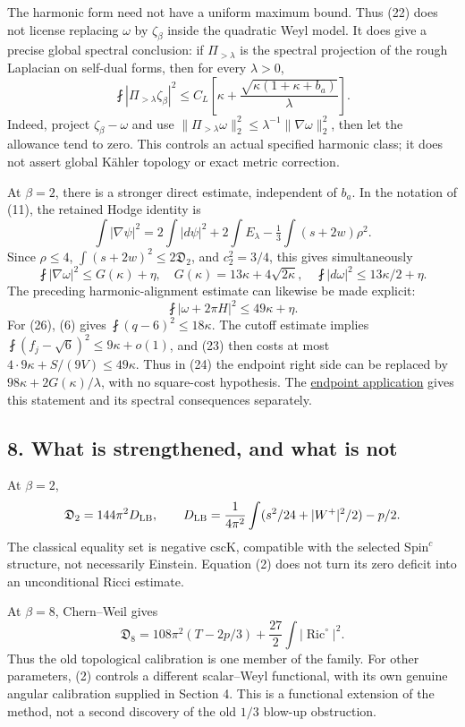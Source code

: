 \documentclass[
  10pt,
]{article}
\begin{document}
The harmonic form need not have a uniform maximum bound. Thus (22) does
not license replacing \(\omega\) by \(\zeta_\beta\) inside the quadratic
Weyl model. It does give a precise global spectral conclusion: if
\(\Pi_{>\lambda}\) is the spectral projection of the rough Laplacian on
self-dual forms, then for every \(\lambda>0\), \[
\fint|\Pi_{>\lambda}\zeta_\beta|^2
\le C_L\left[\kappa+
\frac{\sqrt{\kappa(1+\kappa+b_a)}}{\lambda}\right].
\tag{24}
\] Indeed, project \(\zeta_\beta-\omega\) and use
\(\|\Pi_{>\lambda}\omega\|_2^2 \le\lambda^{-1}\|\nabla\omega\|_2^2\),
then let the allowance tend to zero. This controls an actual specified
harmonic class; it does not assert global Kähler topology or exact
metric correction.

At \(\beta=2\), there is a stronger direct estimate, independent of
\(b_a\). In the notation of (11), the retained Hodge identity is \[
\int|\nabla\psi|^2
=2\int|d\psi|^2+2\int E_\lambda
-\tfrac13\int(s+2w)\rho^2.
\] Since \(\rho\le4\), \(\int(s+2w)^2\le2\mathfrak D_2\), and
\(c_2^2=3/4\), this gives simultaneously \[
\fint|\nabla\omega|^2\le G(\kappa)+\eta,
\quad G(\kappa)=13\kappa+4\sqrt{2\kappa},
\quad
\fint|d\omega|^2\le13\kappa/2+\eta.
\tag{25}
\] The preceding harmonic-alignment estimate can likewise be made
explicit: \[
\fint|\omega+2\pi H|^2\le49\kappa+\eta.
\tag{26}
\] For (26), (6) gives \(\fint(q-6)^2\le18\kappa\). The cutoff estimate
implies \(\fint(f_j-\sqrt6)^2\le9\kappa+o(1)\), and (23) then costs at
most \(4\cdot9\kappa+S/(9V)\le49\kappa\). Thus in (24) the endpoint
right side can be replaced by \(98\kappa+2G(\kappa)/\lambda\), with no
square-cost hypothesis. The
\href{line1_composed_application.md}{endpoint application} gives this
statement and its spectral consequences separately.

\hypertarget{what-is-strengthened-and-what-is-not}{%
\subsection{8. What is strengthened, and what is
not}\label{what-is-strengthened-and-what-is-not}}

At \(\beta=2\), \[
\mathfrak D_2=144\pi^2D_{\rm LB},\qquad
D_{\rm LB}=\frac1{4\pi^2}\int(s^2/24+|W^+|^2/2)-p/2.
\] The classical equality set is negative cscK, compatible with the
selected Spin\(^c\) structure, not necessarily Einstein. Equation (2)
does not turn its zero deficit into an unconditional Ricci estimate.

At \(\beta=8\), Chern--Weil gives \[
\mathfrak D_8
=108\pi^2(T-2p/3)+\frac{27}{2}\int|\operatorname{Ric}^{\circ}|^2.
\tag{27}
\] Thus the old topological calibration is one member of the family. For
other parameters, (2) controls a different scalar--Weyl functional, with
its own genuine angular calibration supplied in Section 4. This is a
functional extension of the method, not a second discovery of the old
\(1/3\) blow-up obstruction.
\end{document}
